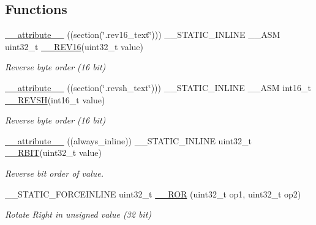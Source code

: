 \subsection*{Functions}
\begin{DoxyCompactItemize}
\item 
\mbox{\hyperlink{group___c_m_s_i_s___core___instruction_interface_gae84a2733711339c5eefeb0d899506b96}{\+\_\+\+\_\+attribute\+\_\+\+\_\+}} ((section(\char`\"{}.rev16\+\_\+text\char`\"{}))) \+\_\+\+\_\+\+S\+T\+A\+T\+I\+C\+\_\+\+I\+N\+L\+I\+NE \+\_\+\+\_\+\+A\+SM uint32\+\_\+t \mbox{\hyperlink{group___c_m_s_i_s___core___instruction_interface_gaa12aedd096506c9639c1581acd5c6a78}{\+\_\+\+\_\+\+R\+E\+V16}}(uint32\+\_\+t value)
\begin{DoxyCompactList}\small\item\em Reverse byte order (16 bit) \end{DoxyCompactList}\item 
\mbox{\hyperlink{group___c_m_s_i_s___core___instruction_interface_gabe2b619a40cc0a7ffa8f765249ccf682}{\+\_\+\+\_\+attribute\+\_\+\+\_\+}} ((section(\char`\"{}.revsh\+\_\+text\char`\"{}))) \+\_\+\+\_\+\+S\+T\+A\+T\+I\+C\+\_\+\+I\+N\+L\+I\+NE \+\_\+\+\_\+\+A\+SM int16\+\_\+t \mbox{\hyperlink{group___c_m_s_i_s___core___instruction_interface_gacb695341318226a5f69ed508166622ac}{\+\_\+\+\_\+\+R\+E\+V\+SH}}(int16\+\_\+t value)
\begin{DoxyCompactList}\small\item\em Reverse byte order (16 bit) \end{DoxyCompactList}\item 
\mbox{\hyperlink{group___c_m_s_i_s___core___instruction_interface_gab926fe7178a379c3a7c0410b06fcb661}{\+\_\+\+\_\+attribute\+\_\+\+\_\+}} ((always\+\_\+inline)) \+\_\+\+\_\+\+S\+T\+A\+T\+I\+C\+\_\+\+I\+N\+L\+I\+NE uint32\+\_\+t \mbox{\hyperlink{group___c_m_s_i_s___core___instruction_interface_gaf944a7b7d8fd70164cca27669316bcf7}{\+\_\+\+\_\+\+R\+B\+IT}}(uint32\+\_\+t value)
\begin{DoxyCompactList}\small\item\em Reverse bit order of value. \end{DoxyCompactList}\item 
\+\_\+\+\_\+\+S\+T\+A\+T\+I\+C\+\_\+\+F\+O\+R\+C\+E\+I\+N\+L\+I\+NE uint32\+\_\+t \mbox{\hyperlink{group___c_m_s_i_s___core___instruction_interface_gab16acb6456176f1e87a4f2724c2b6028}{\+\_\+\+\_\+\+R\+OR}} (uint32\+\_\+t op1, uint32\+\_\+t op2)
\begin{DoxyCompactList}\small\item\em Rotate Right in unsigned value (32 bit) \end{DoxyCompactList}\item 

\end{DoxyCompactItemize}
